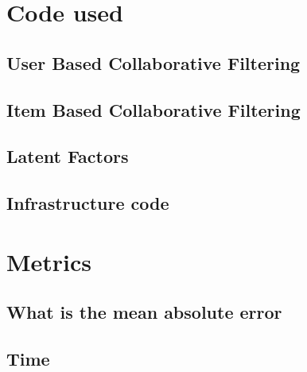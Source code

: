 \section{Code used}
\subsection{User Based Collaborative Filtering}
\subsection{Item Based Collaborative Filtering}

\subsection{Latent Factors}

\subsection{Infrastructure code}


\section{Metrics}
\subsection{What is the mean absolute error}
\subsection{Time}
\listoftables
\newpage
\listoffigures